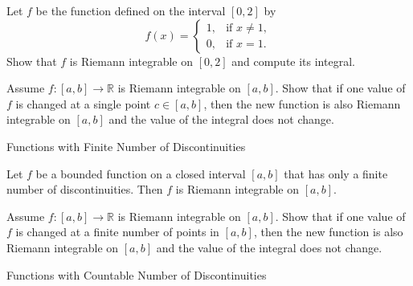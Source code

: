 \documentclass[12pt,a4paper]{article}
\begin{document}
\clearpage

\begin{theorem}
    Let $f$ be the function defined on the interval $[0,2]$ by
    \[
        f(x) = 
        \begin{cases}
            1, & \text{if } x \ne 1,\\
            0, & \text{if } x = 1.
        \end{cases}
    \]
    Show that $f$ is Riemann integrable on $[0,2]$ and compute its integral.
\end{theorem}

\clearpage

\begin{theorem}
    Assume $f: [a,b] \to \mathbb{R}$ is Riemann integrable on $[a,b]$. Show that if one value of $f$ is changed at a single point $c \in [a,b]$, then the new function is also Riemann integrable on $[a,b]$ and the value of the integral does not change.
\end{theorem}

\clearpage

\begin{heading}
    Functions with Finite Number of Discontinuities
\end{heading}

\vspace{10pt}

\begin{theorem}
    Let $f$ be a bounded function on a closed interval $[a,b]$ that has only a finite number of discontinuities. Then $f$ is Riemann integrable on $[a,b]$.
    
\end{theorem}

\clearpage

\begin{theorem}
    Assume $f: [a,b] \to \mathbb{R}$ is Riemann integrable on $[a,b]$. Show that if one value of $f$ is changed at a finite number of points in $[a,b]$, then the new function is also Riemann integrable on $[a,b]$ and the value of the integral does not change.
\end{theorem}

\clearpage

\begin{heading}
    Functions with Countable Number of Discontinuities
\end{heading}
\end{document}
